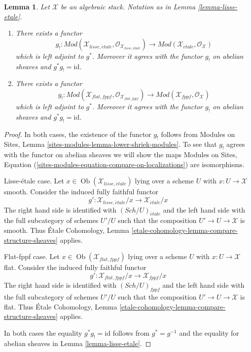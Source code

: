 \documentclass{stacks-project}
\theoremstyle{plain}
\newtheorem{lemma}[subsection]{Lemma}
\theoremstyle{definition}
\theoremstyle{remark}
\numberwithin{equation}{subsection}
\def\Sch{\mathit{Sch}}
\def\Ob{\mathop{\mathrm{Ob}}\nolimits}
\def\etale{{\acute{e}tale}}
\begin{document}
\begin{lemma}
\label{lemma-lisse-etale-modules}
Let $\mathcal{X}$ be an algebraic stack. Notation as in
Lemma \ref{lemma-lisse-etale}.
\begin{enumerate}
\item There exists a functor
$$
g_! :
\textit{Mod}(\mathcal{X}_{lisse,\etale},
\mathcal{O}_{\mathcal{X}_{lisse,\etale}})
\longrightarrow
\textit{Mod}(\mathcal{X}_\etale, \mathcal{O}_{\mathcal{X}})
$$
which is left adjoint to $g^*$. Moreover it agrees with the functor $g_!$
on abelian sheaves and $g^*g_! = \text{id}$.
\item There exists a functor
$$
g_! :
\textit{Mod}(\mathcal{X}_{flat,fppf},
\mathcal{O}_{\mathcal{X}_{flat,fppf}})
\longrightarrow
\textit{Mod}(\mathcal{X}_{fppf}, \mathcal{O}_{\mathcal{X}})
$$
which is left adjoint to $g^*$. Moreover it agrees with the functor $g_!$
on abelian sheaves and $g^*g_! = \text{id}$.
\end{enumerate}
\end{lemma}

\begin{proof}
In both cases, the existence of the functor $g_!$ follows from
Modules on Sites, Lemma \ref{sites-modules-lemma-lower-shriek-modules}.
To see that $g_!$ agrees with the functor on abelian sheaves we will
show the maps Modules on Sites, Equation
(\ref{sites-modules-equation-compare-on-localizations})
are isomorphisms.

\medskip\noindent
Lisse-\'etale case. Let $x \in \Ob(\mathcal{X}_{lisse,\etale})$
lying over a scheme $U$ with $x : U \to \mathcal{X}$ smooth.
Consider the induced fully faithful functor
$$
g' :
\mathcal{X}_{lisse,\etale}/x
\longrightarrow
\mathcal{X}_\etale/x
$$
The right hand side is identified with $(\Sch/U)_\etale$ and the
left hand side with the full subcategory of schemes $U'/U$ such that
the composition $U' \to U \to \mathcal{X}$ is smooth. Thus
\'Etale Cohomology, Lemma
\ref{etale-cohomology-lemma-compare-structure-sheaves}
applies.

\medskip\noindent
Flat-fppf case. Let $x \in \Ob(\mathcal{X}_{flat,fppf})$
lying over a scheme $U$ with $x : U \to \mathcal{X}$ flat.
Consider the induced fully faithful functor
$$
g' :
\mathcal{X}_{flat,fppf}/x
\longrightarrow
\mathcal{X}_{fppf}/x
$$
The right hand side is identified with $(\Sch/U)_{fppf}$ and the
left hand side with the full subcategory of schemes $U'/U$ such that
the composition $U' \to U \to \mathcal{X}$ is flat. Thus
\'Etale Cohomology, Lemma
\ref{etale-cohomology-lemma-compare-structure-sheaves}
applies.

\medskip\noindent
In both cases the equality $g^*g_! = \text{id}$ follows from
$g^* = g^{-1}$ and the
equality for abelian sheaves in Lemma \ref{lemma-lisse-etale}.
\end{proof}
\end{document}

